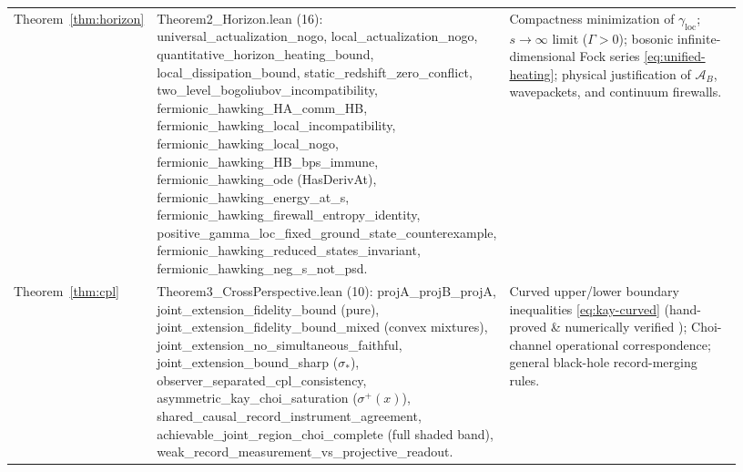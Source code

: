 \documentclass[11pt,a4paper]{article}
\theoremstyle{definition}
\theoremstyle{remark}
\newcommand{\cA}{\mathcal{A}}
\newcommand{\1}{\mathbf{1}}
\newcommand{\code}[1]{{\footnotesize\ttfamily #1}}
\begin{document}
\begin{table}[!tb]
\begin{tabular}{@{}>{\raggedright\arraybackslash}p{0.13\linewidth}>{\raggedright\arraybackslash}p{0.46\linewidth}>{\raggedright\arraybackslash}p{0.34\linewidth}@{}}
Theorem~\ref{thm:horizon} & \code{Theorem2\_\allowbreak Horizon.lean} (16): \code{universal\_\allowbreak actualization\_\allowbreak nogo}, \code{local\_\allowbreak actualization\_\allowbreak nogo}, \code{quantitative\_\allowbreak horizon\_\allowbreak heating\_\allowbreak bound}, \code{local\_\allowbreak dissipation\_\allowbreak bound}, \code{static\_\allowbreak redshift\_\allowbreak zero\_\allowbreak conflict}, \code{two\_\allowbreak level\_\allowbreak bogoliubov\_\allowbreak incompatibility}, \code{fermionic\_\allowbreak hawking\_\allowbreak HA\_\allowbreak comm\_\allowbreak HB}, \code{fermionic\_\allowbreak hawking\_\allowbreak local\_\allowbreak incompatibility}, \code{fermionic\_\allowbreak hawking\_\allowbreak local\_\allowbreak nogo}, \code{fermionic\_\allowbreak hawking\_\allowbreak HB\_\allowbreak bps\_\allowbreak immune}, \code{fermionic\_\allowbreak hawking\_\allowbreak ode} (\code{HasDerivAt}), \code{fermionic\_\allowbreak hawking\_\allowbreak energy\_\allowbreak at\_\allowbreak s}, \code{fermionic\_\allowbreak hawking\_\allowbreak firewall\_\allowbreak entropy\_\allowbreak identity}, \code{positive\_\allowbreak gamma\_\allowbreak loc\_\allowbreak fixed\_\allowbreak ground\_\allowbreak state\_\allowbreak counterexample}, \code{fermionic\_\allowbreak hawking\_\allowbreak reduced\_\allowbreak states\_\allowbreak invariant}, \code{fermionic\_\allowbreak hawking\_\allowbreak neg\_\allowbreak s\_\allowbreak not\_\allowbreak psd}. & Compactness minimization of $\gamma_{\mathrm{loc}}$; $s\to\infty$ limit ($\Gamma>0$); bosonic infinite-dimensional Fock series \eqref{eq:unified-heating}; physical justification of $\cA_B$, wavepackets, and continuum firewalls. \\
Theorem~\ref{thm:cpl} & \code{Theorem3\_\allowbreak CrossPerspective.lean} (10): \code{projA\_\allowbreak projB\_\allowbreak projA}, \code{joint\_\allowbreak extension\_\allowbreak fidelity\_\allowbreak bound} (pure), \code{joint\_\allowbreak extension\_\allowbreak fidelity\_\allowbreak bound\_\allowbreak mixed} (convex mixtures), \code{joint\_\allowbreak extension\_\allowbreak no\_\allowbreak simultaneous\_\allowbreak faithful}, \code{joint\_\allowbreak extension\_\allowbreak bound\_\allowbreak sharp} ($\sigma_*$), \code{observer\_\allowbreak separated\_\allowbreak cpl\_\allowbreak consistency}, \code{asymmetric\_\allowbreak kay\_\allowbreak choi\_\allowbreak saturation} ($\sigma^+(x)$), \code{shared\_\allowbreak causal\_\allowbreak record\_\allowbreak instrument\_\allowbreak agreement}, \code{achievable\_\allowbreak joint\_\allowbreak region\_\allowbreak choi\_\allowbreak complete} (full shaded band), \code{weak\_\allowbreak record\_\allowbreak measurement\_\allowbreak vs\_\allowbreak projective\_\allowbreak readout}. & Curved upper/lower boundary inequalities \eqref{eq:kay-curved} (hand-proved \& numerically verified \cite{Kay2009,Nechita2021}); Choi-channel operational correspondence; general black-hole record-merging rules. \\

\end{tabular}
\end{table}
\end{document}
